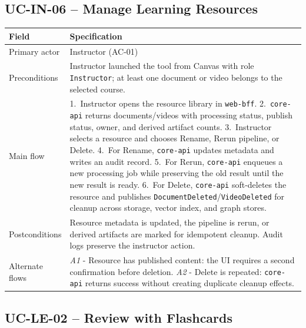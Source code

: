 \subsection{UC-IN-06 -- Manage Learning Resources}

\begin{longtable}{|p{3.2cm}|p{10.3cm}|}
\hline
\textbf{Field} & \textbf{Specification} \\
\hline
\endhead
Primary actor & Instructor (AC-01) \\
\hline
Preconditions & Instructor launched the tool from Canvas with role
    \texttt{Instructor}; at least one document or video belongs to the
    selected course. \\
\hline
Main flow &
    1.\ Instructor opens the resource library in \texttt{web-bff}.
    2.\ \texttt{core-api} returns documents/videos with processing
    status, publish status, owner, and derived artifact counts.
    3.\ Instructor selects a resource and chooses Rename, Rerun
    pipeline, or Delete.
    4.\ For Rename, \texttt{core-api} updates metadata and writes an
    audit record.
    5.\ For Rerun, \texttt{core-api} enqueues a new processing job
    while preserving the old result until the new result is ready.
    6.\ For Delete, \texttt{core-api} soft-deletes the resource and
    publishes \texttt{DocumentDeleted}/\texttt{VideoDeleted} for
    cleanup across storage, vector index, and graph stores. \\
\hline
Postconditions & Resource metadata is updated, the pipeline is rerun,
    or derived artifacts are marked for idempotent cleanup. Audit logs
    preserve the instructor action. \\
\hline
Alternate flows &
    \emph{A1} - Resource has published content: the UI requires a
    second confirmation before deletion.
    \emph{A2} - Delete is repeated: \texttt{core-api} returns success
    without creating duplicate cleanup effects. \\
\hline
\end{longtable}

\subsection{UC-LE-02 -- Review with Flashcards}

